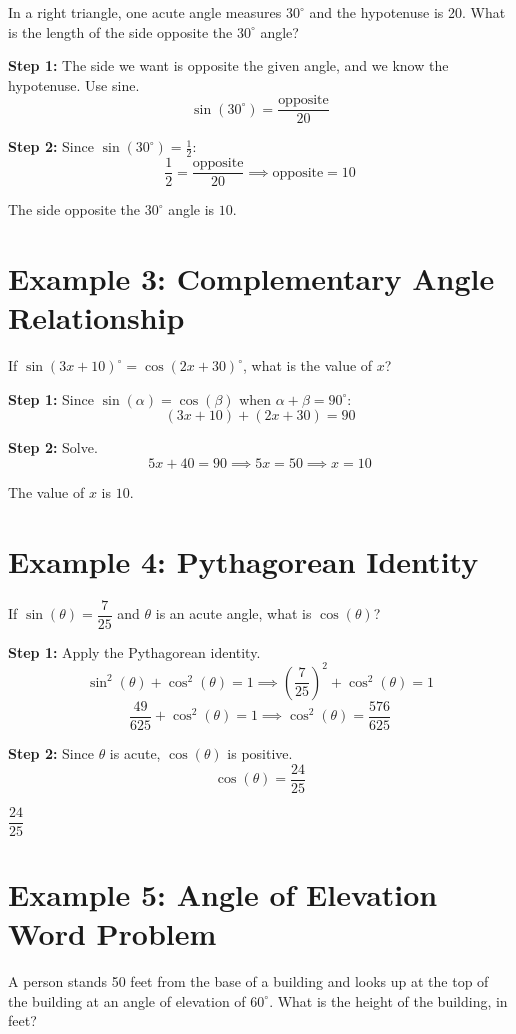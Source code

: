 \documentclass[14pt]{extarticle}
\begin{document}
In a right triangle, one acute angle measures \(30^\circ\) and the hypotenuse is 20. What is the length of the side opposite the \(30^\circ\) angle?

\textbf{Step 1:} The side we want is opposite the given angle, and we know the hypotenuse. Use sine.
\[
\sin(30^\circ) = \frac{\text{opposite}}{20}
\]

\textbf{Step 2:} Since \(\sin(30^\circ) = \frac{1}{2}\):
\[
\frac{1}{2} = \frac{\text{opposite}}{20} \implies \text{opposite} = 10
\]

The side opposite the \(30^\circ\) angle is \(\boxed{10}\).

\section*{Example 3: Complementary Angle Relationship}

If \(\sin(3x + 10)^\circ = \cos(2x + 30)^\circ\), what is the value of \(x\)?

\textbf{Step 1:} Since \(\sin(\alpha) = \cos(\beta)\) when \(\alpha + \beta = 90^\circ\):
\[
(3x + 10) + (2x + 30) = 90
\]

\textbf{Step 2:} Solve.
\[
5x + 40 = 90 \implies 5x = 50 \implies x = 10
\]

The value of \(x\) is \(\boxed{10}\).

\section*{Example 4: Pythagorean Identity}

If \(\sin(\theta) = \dfrac{7}{25}\) and \(\theta\) is an acute angle, what is \(\cos(\theta)\)?

\textbf{Step 1:} Apply the Pythagorean identity.
\[
\sin^2(\theta) + \cos^2(\theta) = 1 \implies \left(\frac{7}{25}\right)^2 + \cos^2(\theta) = 1
\]
\[
\frac{49}{625} + \cos^2(\theta) = 1 \implies \cos^2(\theta) = \frac{576}{625}
\]

\textbf{Step 2:} Since \(\theta\) is acute, \(\cos(\theta)\) is positive.
\[
\cos(\theta) = \frac{24}{25}
\]

\(\boxed{\dfrac{24}{25}}\)

\section*{Example 5: Angle of Elevation Word Problem}

A person stands 50 feet from the base of a building and looks up at the top of the building at an angle of elevation of \(60^\circ\). What is the height of the building, in feet?
\end{document}
